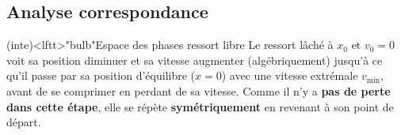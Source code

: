 \documentclass[../../main/main.tex]{subfiles}
\begin{document}
\subsection{Analyse correspondance}
\begin{tcb}[width=\linewidth, sidebyside, righthand ratio=.3]
  (inte)<lftt>"bulb"{Espace des phases ressort libre}
	Le ressort lâché à $x_0$ et $v_0=0$ voit sa position diminuer
	et sa vitesse augmenter (algébriquement) jusqu'à ce qu'il passe par sa
	position d'équilibre ($x=0$) avec une vitesse extrémale $v_{\min}$,
	avant de se comprimer en perdant de sa vitesse.
	\bigbreak
	Comme il n'y a
	\textbf{pas de perte dans cette étape}, elle se répète
	\textbf{symétriquement} en revenant à son point de départ.
	\tcblower
	\begin{center}
	\end{center}
\end{tcb}
\end{document}
